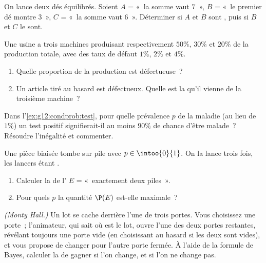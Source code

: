 \begin{exercise}[$\star$]\label{exo:g12:condprob:3}
On lance deux dés équilibrés. Soient $A$ = «~la somme vaut $7$~», $B$ =
«~le premier dé montre $3$~», $C$ = «~la somme vaut $6$~». Déterminer si $A$
et $B$ sont , puis si $B$ et $C$ le sont.
\end{exercise}

\begin{exercise}[$\star\star$]\label{exo:g12:condprob:4}
Une usine a trois machines produisant respectivement $50\%$, $30\%$ et
$20\%$ de la production totale, avec des taux de défaut $1\%$, $2\%$ et
$4\%$.
\begin{enumerate}
  \item Quelle proportion de la production est défectueuse~?
  \item Un article tiré au hasard est défectueux. Quelle est la 
        qu'il vienne de la troisième machine~?
\end{enumerate}
\end{exercise}

\begin{exercise}[$\star\star$]\label{exo:g12:condprob:5}
Dans l'\cref{ex:g12:condprob:test}, pour quelle prévalence $p$ de la maladie
(au lieu de $1\%$) un test positif signifierait-il au moins $90\%$ de chance
d'être malade~? Résoudre l'inégalité et commenter.
\end{exercise}

\begin{exercise}[$\star\star$]\label{exo:g12:condprob:6}
Une pièce biaisée tombe sur pile avec  $p \in \intoo{0}{1}$. On
la lance trois fois, les lancers étant .
\begin{enumerate}
  \item Calculer la  de l' $E$ = «~exactement deux
        piles~».
  \item Pour quels $p$ la quantité $\P(E)$ est-elle maximale~?
\end{enumerate}
\end{exercise}

\begin{exercise}[$\star\star\star$]\label{exo:g12:condprob:7}
\emph{(Monty Hall.)} Un lot se cache derrière l'une de trois portes. Vous
choisissez une porte~; l'animateur, qui sait où est le lot, ouvre l'une des
deux portes restantes, révélant toujours une porte vide (en choisissant au
hasard si les deux sont vides), et vous propose de changer pour l'autre
porte fermée. À l'aide de la formule de Bayes, calculer la  de
gagner si l'on change, et si l'on ne change pas.
\end{exercise}

